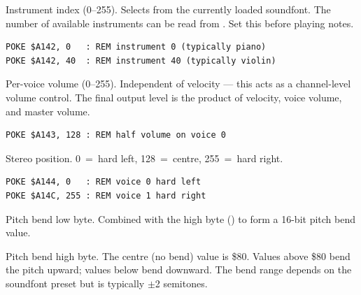 

Instrument index (0--255).  Selects from the currently loaded soundfont.  The
number of available instruments can be read from .  Set this before
playing notes.

\begin{lstlisting}
POKE $A142, 0   : REM instrument 0 (typically piano)
POKE $A142, 40  : REM instrument 40 (typically violin)
\end{lstlisting}



Per-voice volume (0--255).  Independent of velocity --- this acts as a
channel-level volume control.  The final output level is the product of
velocity, voice volume, and master volume.

\begin{lstlisting}
POKE $A143, 128 : REM half volume on voice 0
\end{lstlisting}



Stereo position.  0~=~hard left, 128~=~centre, 255~=~hard right.

\begin{lstlisting}
POKE $A144, 0   : REM voice 0 hard left
POKE $A14C, 255 : REM voice 1 hard right
\end{lstlisting}



Pitch bend low byte.  Combined with the high byte () to form a
16-bit pitch bend value.



Pitch bend high byte.  The centre (no bend) value is \$80.  Values above \$80
bend the pitch upward; values below bend downward.  The bend range depends on
the soundfont preset but is typically $\pm$2 semitones.


